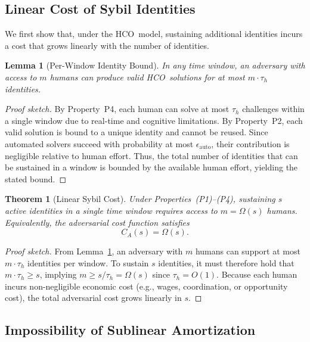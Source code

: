 \documentclass[11pt]{article}
\newcommand{\HCO}{HCO\xspace}
\newtheorem{theorem}{Theorem}
\newtheorem{lemma}{Lemma}
\begin{document}
\subsection{Linear Cost of Sybil Identities}

We first show that, under the \HCO\ model, sustaining additional identities incurs a cost that grows linearly with the number of identities.

\begin{lemma}[Per-Window Identity Bound]
	\label{lem:identity-bound}
	In any time window, an adversary with access to $m$ humans can produce valid \HCO\ solutions for at most $m \cdot \tau_h$ identities.
\end{lemma}

\begin{proof}[Proof sketch]
	By Property~P4, each human can solve at most $\tau_h$ challenges within a single window due to real-time and cognitive limitations. By Property~P2, each valid solution is bound to a unique identity and cannot be reused. Since automated solvers succeed with probability at most $\epsilon_{\mathrm{auto}}$, their contribution is negligible relative to human effort. Thus, the total number of identities that can be sustained in a window is bounded by the available human effort, yielding the stated bound.
\end{proof}

\begin{theorem}[Linear Sybil Cost]
	\label{thm:linear-cost}
	Under Properties~(P1)--(P4), sustaining $s$ active identities in a single time window requires access to $m = \Omega(s)$ humans. Equivalently, the adversarial cost function satisfies
	\[
	C_A(s) = \Omega(s).
	\]
\end{theorem}

\begin{proof}[Proof sketch]
	From Lemma~\ref{lem:identity-bound}, an adversary with $m$ humans can support at most $m \cdot \tau_h$ identities per window. To sustain $s$ identities, it must therefore hold that $m \cdot \tau_h \ge s$, implying $m \ge s / \tau_h = \Omega(s)$ since $\tau_h = O(1)$. Because each human incurs non-negligible economic cost (e.g., wages, coordination, or opportunity cost), the total adversarial cost grows linearly in $s$.
\end{proof}

\subsection{Impossibility of Sublinear Amortization}
\end{document}
